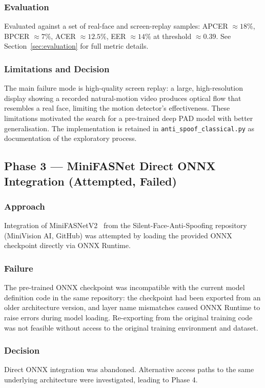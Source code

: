 \documentclass[11pt,a4paper]{article}
\begin{document}
\subsubsection{Evaluation}
Evaluated against a set of real-face and screen-replay samples:
APCER $\approx 18\%$, BPCER $\approx 7\%$, ACER $\approx 12.5\%$,
EER $\approx 14\%$ at threshold $\approx 0.39$.
See Section~\ref{sec:evaluation} for full metric details.

\subsubsection{Limitations and Decision}
The main failure mode is high-quality screen replay: a large, high-resolution
display showing a recorded natural-motion video produces optical flow that resembles
a real face, limiting the motion detector's effectiveness.
These limitations motivated the search for a pre-trained deep PAD model with
better generalisation.
The implementation is retained in \texttt{anti\_spoof\_classical.py} as documentation
of the exploratory process.

\subsection{Phase 3 --- MiniFASNet Direct ONNX Integration (Attempted, Failed)}

\subsubsection{Approach}
Integration of MiniFASNetV2~\cite{liu2021minifasnet} from the Silent-Face-Anti-Spoofing
repository (MiniVision AI, GitHub) was attempted by loading the provided ONNX checkpoint
directly via ONNX Runtime.

\subsubsection{Failure}
The pre-trained ONNX checkpoint was incompatible with the current model definition
code in the same repository: the checkpoint had been exported from an older
architecture version, and layer name mismatches caused ONNX Runtime to raise errors
during model loading.
Re-exporting from the original training code was not feasible without access to
the original training environment and dataset.

\subsubsection{Decision}
Direct ONNX integration was abandoned.
Alternative access paths to the same underlying architecture were investigated,
leading to Phase 4.
\end{document}
